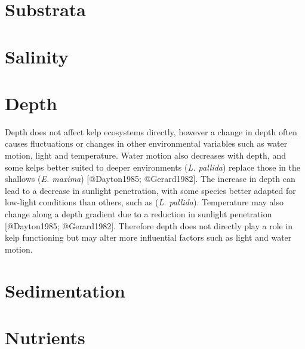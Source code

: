 \documentclass[]{article}
\begin{document}
\section{Substrata}\label{substrata}

\section{Salinity}\label{salinity}

\section{Depth}\label{depth}

Depth does not aﬀect kelp ecosystems directly, however a change in depth
often causes ﬂuctuations or changes in other environmental variables
such as water motion, light and temperature. Water motion also decreases
with depth, and some kelps better suited to deeper environments
(\emph{L. pallida}) replace those in the shallows (\emph{E. maxima})
{[}@Dayton1985; @Gerard1982{]}. The increase in depth can lead to a
decrease in sunlight penetration, with some species better adapted for
low-light conditions than others, such as (\emph{L. pallida}).
Temperature may also change along a depth gradient due to a reduction in
sunlight penetration {[}@Dayton1985; @Gerard1982{]}. Therefore depth
does not directly play a role in kelp functioning but may alter more
inﬂuential factors such as light and water motion.

\section{Sedimentation}\label{sedimentation}

\section{Nutrients}\label{nutrients}
\end{document}
